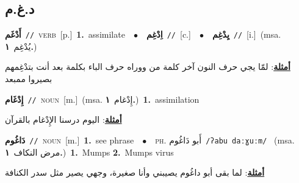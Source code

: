 \documentclass[10pt,a4paper,twoside]{article} %
\begin{document}
\begin{multicols}{2}
\vspace{-3mm}
\subsection*{\color{blue}\foreignlanguage{arabic}{د.غ.م}\color{blue}{}} 

{\setlength\topsep{0pt}\textbf{\foreignlanguage{arabic}{أَدْغَم}}\ {\color{gray}\texttt{//}\color{black}}\ \textsc{verb}\ [p.]\ \textbf{1.}~assimilate\ \ $\bullet$\ \ \setlength\topsep{0pt}\textbf{\foreignlanguage{arabic}{اِدْغِم}}\ {\color{gray}\texttt{//}\color{black}}\ [c.]\ \ $\bullet$\ \ \setlength\topsep{0pt}\textbf{\foreignlanguage{arabic}{يِدْغِم}}\ {\color{gray}\texttt{//}\color{black}}\ [i.]\ \color{gray}(msa. \foreignlanguage{arabic}{يُدْغِم}~\foreignlanguage{arabic}{\textbf{١.}})\color{black}\  \begin{flushright}\color{gray}\foreignlanguage{arabic}{\textbf{\underline{\foreignlanguage{arabic}{أمثلة}}}: لمّا يجي حرف النون آخر كلمة من ووراه حرف الباء بكلمة بعد أنت بتدْغِمهم بصيروا ممبعد}\end{flushright}\color{black}} \vspace{2mm}

{\setlength\topsep{0pt}\textbf{\foreignlanguage{arabic}{إِدْغَام}}\ {\color{gray}\texttt{//}\color{black}}\ \textsc{noun}\ [m.]\ \color{gray}(msa. \foreignlanguage{arabic}{إِدْغام}~\foreignlanguage{arabic}{\textbf{١.}})\color{black}\ \textbf{1.}~assimilation\  \begin{flushright}\color{gray}\foreignlanguage{arabic}{\textbf{\underline{\foreignlanguage{arabic}{أمثلة}}}: اليوم درسنا الإِدْغام بالقرآن}\end{flushright}\color{black}} \vspace{2mm}

{\setlength\topsep{0pt}\textbf{\foreignlanguage{arabic}{دَاغُوم}}\ {\color{gray}\texttt{//}\color{black}}\ \textsc{noun}\ [m.]\ \textbf{1.}~see phrase\ \ $\bullet$\ \ \textsc{ph.} \color{gray} \foreignlanguage{arabic}{أَبو دَاغُوم}\color{black}\ {\color{gray}\texttt{/{\sffamily ʔabu daːɣuːm}/}\color{black}}\ \color{gray} (msa. \foreignlanguage{arabic}{مرض النكاف}~\foreignlanguage{arabic}{\textbf{١.}})\color{black}\ \textbf{1.}~Mumps  \textbf{2.}~Mumps virus\  \begin{flushright}\color{gray}\foreignlanguage{arabic}{\textbf{\underline{\foreignlanguage{arabic}{أمثلة}}}: لما بقى أبو داغُوم يصيبني وأنا صغيرة، وجهي يصير مثل سدر الكنافة}\end{flushright}\color{black}} \vspace{2mm}


\end{multicols}
\end{document}
